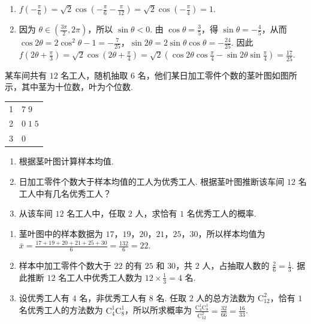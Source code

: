 \begin{solution}
\begin{enumerate}
\item \(f\left(-\frac{\pi}{6}\right)=\sqrt2\cos\left(-\frac\pi6-\frac\pi{12}\right)=\sqrt2\cos\left(-\frac\pi4\right)=1\).
\item 因为 \(\theta\in(\frac{3\pi}{2},2\pi)\)，所以 \(\sin\theta<0\). 由 \(\cos\theta=\frac35\)，得 \(\sin\theta=-\frac45\)，从而 \(\cos2\theta=2\cos^2\theta-1=-\frac7{25}\)，\(\sin2\theta=2\sin\theta\cos\theta=-\frac{24}{25}\). 因此
\(f\left(2\theta+\frac\pi3\right)=\sqrt2\cos\left(2\theta+\frac\pi4\right)=\sqrt2\left(\cos2\theta\cos\frac\pi4-\sin2\theta\sin\frac\pi4\right)=\frac{17}{25}\).
\end{enumerate}
\end{solution}

\begin{problem}
某车间共有 \(12\) 名工人，随机抽取 \(6\) 名，他们某日加工零件个数的茎叶图如图所示，其中茎为十位数，叶为个位数.

\begin{center}
\begin{tabular}{c|l}
1 & \(7\;9\) \\
2 & \(0\;1\;5\) \\
3 & \(0\)
\end{tabular}
\end{center}

\begin{enumerate}
\item 根据茎叶图计算样本均值.
\item 日加工零件个数大于样本均值的工人为优秀工人. 根据茎叶图推断该车间 \(12\) 名工人中有几名优秀工人？
\item 从该车间 \(12\) 名工人中，任取 \(2\) 人，求恰有 \(1\) 名优秀工人的概率.
\end{enumerate}
\end{problem}

\begin{solution}
\begin{enumerate}
\item 茎叶图中的样本数据为 \(17\)，\(19\)，\(20\)，\(21\)，\(25\)，\(30\)，所以样本均值为 \(\bar x=\frac{17+19+20+21+25+30}{6}=\frac{132}{6}=22\).
\item 样本中加工零件个数大于 \(22\) 的有 \(25\) 和 \(30\)，共 \(2\) 人，占抽取人数的 \(\frac26=\frac13\). 据此推断 \(12\) 名工人中优秀工人数为 \(12\times\frac13=4\) 名.
\item 设优秀工人有 \(4\) 名，非优秀工人有 \(8\) 名. 任取 \(2\) 人的总方法数为 \(\mathrm C_{12}^{2}\)，恰有 \(1\) 名优秀工人的方法数为 \(\mathrm C_{4}^{1}\mathrm C_{8}^{1}\)，所以所求概率为 \(\frac{\mathrm C_{4}^{1}\mathrm C_{8}^{1}}{\mathrm C_{12}^{2}}=\frac{32}{66}=\frac{16}{33}\).
\end{enumerate}
\end{solution}

